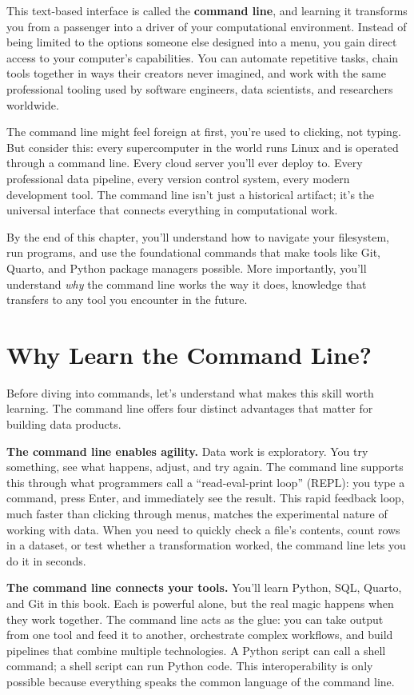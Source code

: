 \documentclass[
  letterpaper,
  DIV=11,
  numbers=noendperiod]{scrreprt}
\begin{document}
This text-based interface is called the \textbf{command line}, and
learning it transforms you from a passenger into a driver of your
computational environment. Instead of being limited to the options
someone else designed into a menu, you gain direct access to your
computer's capabilities. You can automate repetitive tasks, chain tools
together in ways their creators never imagined, and work with the same
professional tooling used by software engineers, data scientists, and
researchers worldwide.

The command line might feel foreign at first, you're used to clicking,
not typing. But consider this: every supercomputer in the world runs
Linux and is operated through a command line. Every cloud server you'll
ever deploy to. Every professional data pipeline, every version control
system, every modern development tool. The command line isn't just a
historical artifact; it's the universal interface that connects
everything in computational work.

By the end of this chapter, you'll understand how to navigate your
filesystem, run programs, and use the foundational commands that make
tools like Git, Quarto, and Python package managers possible. More
importantly, you'll understand \emph{why} the command line works the way
it does, knowledge that transfers to any tool you encounter in the
future.

\section{Why Learn the Command Line?}\label{why-learn-the-command-line}

Before diving into commands, let's understand what makes this skill
worth learning. The command line offers four distinct advantages that
matter for building data products.

\textbf{The command line enables agility.} Data work is exploratory. You
try something, see what happens, adjust, and try again. The command line
supports this through what programmers call a ``read-eval-print loop''
(REPL): you type a command, press Enter, and immediately see the result.
This rapid feedback loop, much faster than clicking through menus,
matches the experimental nature of working with data. When you need to
quickly check a file's contents, count rows in a dataset, or test
whether a transformation worked, the command line lets you do it in
seconds.

\textbf{The command line connects your tools.} You'll learn Python, SQL,
Quarto, and Git in this book. Each is powerful alone, but the real magic
happens when they work together. The command line acts as the glue: you
can take output from one tool and feed it to another, orchestrate
complex workflows, and build pipelines that combine multiple
technologies. A Python script can call a shell command; a shell script
can run Python code. This interoperability is only possible because
everything speaks the common language of the command line.
\end{document}
